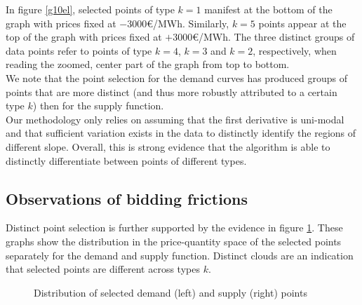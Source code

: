 In figure \ref{g10el}, selected points of type $k=1$ manifest at the bottom of the graph with prices fixed at $-3000$\euro /MWh. Similarly, $k=5$ points appear at the top of the graph with prices fixed at $+3000$\euro /MWh. The three distinct groups of data points refer to points of type $k=4$, $k=3$ and $k=2$, respectively, when reading the zoomed, center part of the graph from top to bottom.\\

We note that the point selection for the demand curves has produced groups of points that are more distinct (and thus more robustly attributed to a certain type $k$) then for the supply function. \\

Our methodology only relies on assuming that the first derivative is uni-modal and that sufficient variation exists in the data to distinctly identify the regions of different slope. Overall, this is strong evidence that the algorithm is able to distinctly differentiate between points of different types. \\

\subsection{Observations of bidding frictions}
Distinct point selection is further supported by the evidence in figure \ref{patternsgraph}. These graphs show the distribution in the price-quantity space of the selected points separately for the demand and supply function. Distinct clouds are an indication that selected points are different across types $k$.\\

\begin{figure}[!ht]
\caption{Distribution of selected demand (left) and supply (right) points}
\label{patternsgraph}
\end{figure}


